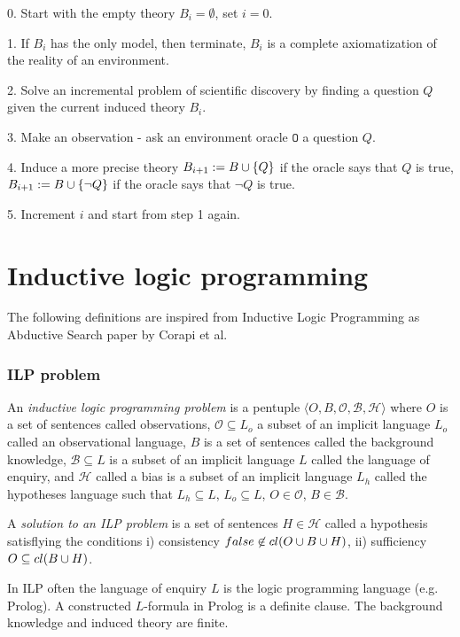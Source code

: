 0. Start with the empty theory $B_i=\emptyset$, set $i=0$.

1. If $B_i$ has the only model, then terminate, $B_i$ is a complete axiomatization of the reality of an environment.

2. Solve an incremental problem of scientific discovery by finding a question $Q$ given the current induced theory $B_i$.

3. Make an observation - ask an environment oracle $\mathtt{O}$ a question $Q$.

4. Induce a more precise theory $B_{i+1}:=B \cup \{Q\}$ if the oracle says that $Q$ is true, $B_{i+1}:=B \cup \{\neg Q\}$ if the oracle says that $\neg Q$ is true.

5. Increment $i$ and start from step 1 again.

\chapter{Inductive logic programming}
The following definitions are inspired from Inductive Logic Programming as Abductive Search paper by Corapi et al.\cite{corapi2010}

\subsection{ILP problem}

\begin{defn}\cite{corapi2010}
An \emph{inductive logic programming problem} is a pentuple $\langle O, B, \mathcal{O}, \mathcal{B}, \mathcal{H} \rangle$ where $O$ is a set of sentences called observations, $\mathcal{O} \subseteq L_o$ a subset of an implicit language $L_o$ called an observational language, $B$ is a set of sentences called the background knowledge, $\mathcal{B} \subseteq L$ is a subset of an implicit language $L$ called the language of enquiry, and $\mathcal{H}$ called a bias is a subset of an implicit language $L_h$ called the hypotheses language such that $L_h \subseteq L$, $L_o \subseteq L$, $O \in \mathcal{O}$, $B \in \mathcal{B}$.

A \emph{solution to an ILP problem} is a set of sentences $H \in \mathcal{H}$ called a hypothesis satisflying the conditions
i) consistency $false \not \in cl(O \cup B \cup H)$,
ii) sufficiency $O \subseteq cl(B \cup H)$.
\end{defn}

In ILP often the language of enquiry $L$ is the logic programming language (e.g. Prolog). A constructed $L$-formula in Prolog is a definite clause. The background knowledge and induced theory are finite.

